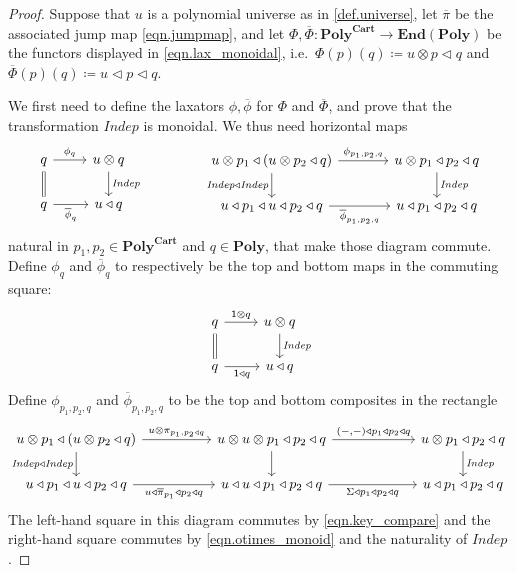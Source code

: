 \documentclass[11pt, one side, article]{memoir}
\theoremstyle{definition}
\theoremstyle{plain}
\newcommand{\Cat}[1]{\mathbf{#1}}%
\newcommand{\Fun}[1]{\mathit{#1}}%
\newcommand{\ol}[1]{\overline{#1}}
\newcommand{\en}{\Cat{End}}
\newcommand{\poly}{\Cat{Poly}}
\newcommand{\polycart}{\poly^{\Cat{Cart}}}
\newcommand{\0}{\textsf{0}}
\newcommand{\1}{\tn{\textsf{1}}}
\newcommand{\tri}{\mathbin{\triangleleft}}
\newcommand{\indep}{\Fun{Indep}}
\newcommand{\jump}{\pi}
\newcommand{\jumpmap}{\ol{\jump}}
\begin{document}
\begin{proof}
Suppose that $u$ is a polynomial universe as in \cref{def.universe}, let $\ol{\pi}$ be the associated jump map \eqref{eqn.jumpmap}, and let $\Phi,\ol{\Phi}\colon\polycart\to\en(\poly)$ be the functors displayed in \eqref{eqn.lax_monoidal}, i.e.\ $\Phi(p)(q)\coloneqq u\otimes p\tri q$ and $\ol{\Phi}(p)(q)\coloneqq u\tri p\tri q$. 

We first need to define the laxators $\phi,\ol\phi$ for $\Phi$ and $\ol{\Phi}$, and prove that the transformation $\indep$ is monoidal. We thus need horizontal maps
\[
\begin{tikzcd}
	q\ar[r, "\phi_q"]\ar[d, equal]&u\otimes q\ar[d, "\indep"]\\
  q\ar[r, "\ol\phi_q"']&u\tri q
\end{tikzcd}
\hspace{.6in}
\begin{tikzcd}[column sep=large]
  u\otimes p_1\tri(u\otimes p_2\tri q)\ar[r, "\phi_{p_1,p_2,q}"]\ar[d, "\indep\tri\indep"']&
  u\otimes p_1\tri p_2\tri q\ar[d, "\indep"]\\
  u\tri p_1\tri u\tri p_2\tri q\ar[r, "\ol\phi_{p_1,p_2,q}"']&
  u\tri p_1\tri p_2\tri q  
\end{tikzcd}
\]
natural in $p_1,p_2\in\polycart$ and $q\in\poly$, that make those diagram commute. Define $\phi_q$ and $\ol\phi_q$ to respectively be the top and bottom maps in the commuting square:
\[
\begin{tikzcd}
	q\ar[r, "\1\otimes q"]\ar[d, equal]&u\otimes q\ar[d, "\indep"]\\
  q\ar[r, "\1\tri q"']&u\tri q
\end{tikzcd}
\]
Define $\phi_{p_1,p_2,q}$ and $\ol\phi_{p_1,p_2,q}$ to be the top and bottom composites in the rectangle
\[
\begin{tikzcd}[column sep=50pt]
  u\otimes p_1\tri(u\otimes p_2\tri q)\ar[r, "u\otimes\jump_{p_1,p_2\tri q}"]\ar[d, "\indep\tri\indep"']&
  u\otimes u\otimes p_1\tri p_2\tri q\ar[r, "{(-,-)}\tri p_1\tri p_2\tri q"]\ar[d]&[10pt]
  u\otimes p_1\tri p_2\tri q\ar[d, "\indep"]\\
  u\tri p_1\tri u\tri p_2\tri q\ar[r, "u\tri\jumpmap_{p_1}\tri p_2\tri q"']&
  u\tri u\tri p_1\tri p_2\tri q\ar[r, "\Sigma\tri p_1\tri p_2\tri q"']&
  u\tri p_1\tri p_2\tri q  
\end{tikzcd}
\]
The left-hand square in this diagram commutes by \eqref{eqn.key_compare} and the right-hand square commutes by \eqref{eqn.otimes_monoid} and the naturality of $\indep$. 


\end{proof}
\end{document}
